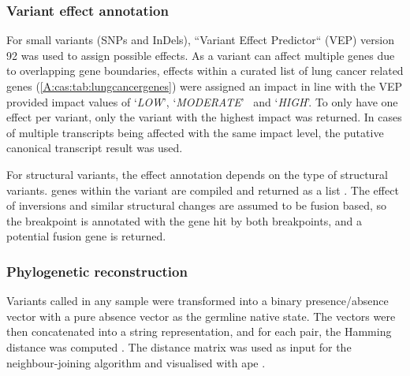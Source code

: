 \cite{Alwahaibi2015,Setiadi2017} 


\subsubsection{Variant effect annotation}
\label{cascade-sec:vep}
For small variants (SNPs and InDels), ``Variant Effect Predictor`` (VEP) version 92 \cite{McLaren2016} was used to assign possible effects. As a variant can affect multiple genes due to overlapping gene boundaries, effects within a curated list of lung cancer related genes (\autoref{A:cas:tab:lungcancergenes}) were assigned an impact in line with the VEP provided impact values of \lq\emph{LOW}\rq, \lq\emph{MODERATE}\rq~ and \lq\emph{HIGH}\rq. To only have one effect per variant, only the variant with the highest impact was returned. In cases of multiple transcripts being affected with the same impact level, the putative canonical transcript result was used.

For structural variants, the effect annotation depends on the type of  structural variants.  genes within the variant are compiled and returned as a list . The effect of inversions and similar structural changes are assumed to be fusion based, so the breakpoint is annotated with the gene hit by both breakpoints, and a potential fusion gene is returned.


\subsubsection{Phylogenetic reconstruction}
\label{cascade-sec:phylo}
Variants called in any sample were transformed into a binary presence/absence vector with a pure absence vector as the germline native state. The vectors were then concatenated into a string representation, and for each pair, the Hamming distance was computed \cite{Hamming1950}. The distance matrix was used as input for the neighbour-joining algorithm and visualised with ape \cite{Paradis2018}.

